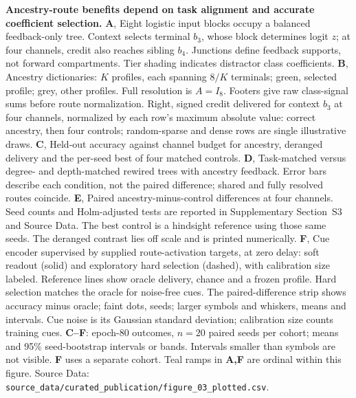 \caption{\textbf{Ancestry-route benefits depend on task alignment and accurate coefficient selection.}
\textbf{A}, Eight logistic input blocks occupy a balanced feedback-only tree. Context selects terminal $b_3$, whose block determines logit $z$; at four channels, credit also reaches sibling $b_4$. Junctions define feedback supports, not forward compartments. Tier shading indicates distractor class coefficients.
\textbf{B}, Ancestry dictionaries: $K$ profiles, each spanning $8/K$ terminals; green, selected profile; grey, other profiles. Full resolution is $A=I_8$. Footers give raw class-signal sums before route normalization. Right, signed credit delivered for context $b_3$ at four channels, normalized by each row's maximum absolute value: correct ancestry, then four controls; random-sparse and dense rows are single illustrative draws.
\textbf{C}, Held-out accuracy against channel budget for ancestry, deranged delivery and the per-seed best of four matched controls.
\textbf{D}, Task-matched versus degree- and depth-matched rewired trees with ancestry feedback. Error bars describe each condition, not the paired difference; shared and fully resolved routes coincide.
\textbf{E}, Paired ancestry-minus-control differences at four channels. Seed counts and Holm-adjusted tests are reported in Supplementary Section~S3 and Source Data. The best control is a hindsight reference using those same seeds. The deranged contrast lies off scale and is printed numerically.
\textbf{F}, Cue encoder supervised by supplied route-activation targets, at zero delay: soft readout (solid) and exploratory hard selection (dashed), with calibration size labeled. Reference lines show oracle delivery, chance and a frozen profile. Hard selection matches the oracle for noise-free cues. The paired-difference strip shows accuracy minus oracle; faint dots, seeds; larger symbols and whiskers, means and intervals. Cue noise is its Gaussian standard deviation; calibration size counts training cues.
\textbf{C--F}: epoch-80 outcomes, $n=20$ paired seeds per cohort; means and 95\% seed-bootstrap intervals or bands. Intervals smaller than symbols are not visible. \textbf{F} uses a separate cohort. Teal ramps in \textbf{A,F} are ordinal within this figure.
Source Data: \texttt{source\_data/curated\_publication/figure\_03\_plotted.csv}.}

